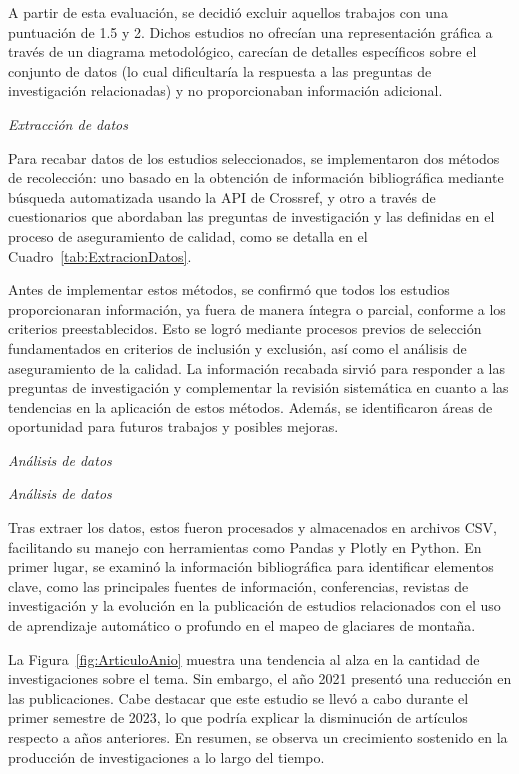 A partir de esta evaluación, se decidió excluir aquellos trabajos con una puntuación de 1.5 y 2. Dichos estudios no ofrecían una representación gráfica a través de un diagrama metodológico, carecían de detalles específicos sobre el conjunto de datos (lo cual dificultaría la respuesta a las preguntas de investigación relacionadas) y no proporcionaban información adicional.

\textit{Extracción de datos}

Para recabar datos de los estudios seleccionados, se implementaron dos métodos de recolección: uno basado en la obtención de información bibliográfica mediante búsqueda automatizada usando la API de Crossref, y otro a través de cuestionarios que abordaban las preguntas de investigación y las definidas en el proceso de aseguramiento de calidad, como se detalla en el Cuadro~\ref{tab:ExtracionDatos}. 

Antes de implementar estos métodos, se confirmó que todos los estudios proporcionaran información, ya fuera de manera íntegra o parcial, conforme a los criterios preestablecidos. Esto se logró mediante procesos previos de selección fundamentados en criterios de inclusión y exclusión, así como el análisis de aseguramiento de la calidad. La información recabada sirvió para responder a las preguntas de investigación y complementar la revisión sistemática en cuanto a las tendencias en la aplicación de estos métodos. Además, se identificaron áreas de oportunidad para futuros trabajos y posibles mejoras.
 
\textit{Análisis de datos}

\textit{Análisis de datos}

Tras extraer los datos, estos fueron procesados y almacenados en archivos CSV, facilitando su manejo con herramientas como Pandas y Plotly en Python. En primer lugar, se examinó la información bibliográfica para identificar elementos clave, como las principales fuentes de información, conferencias, revistas de investigación y la evolución en la publicación de estudios relacionados con el uso de aprendizaje automático o profundo en el mapeo de glaciares de montaña.

La Figura~\ref{fig:ArticuloAnio} muestra una tendencia al alza en la cantidad de investigaciones sobre el tema. Sin embargo, el año 2021 presentó una reducción en las publicaciones. Cabe destacar que este estudio se llevó a cabo durante el primer semestre de 2023, lo que podría explicar la disminución de artículos respecto a años anteriores. En resumen, se observa un crecimiento sostenido en la producción de investigaciones a lo largo del tiempo.

